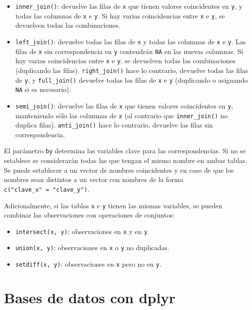 \documentclass[]{book}
\begin{document}
\begin{itemize}
\item
  \texttt{inner\_join()}: devuelve las filas de \texttt{x} que tienen
  valores coincidentes en \texttt{y}, y todas las columnas de \texttt{x}
  e \texttt{y}. Si hay varias coincidencias entre \texttt{x} e
  \texttt{y}, se devuelven todas las combinaciones.
\item
  \texttt{left\_join()}: devuelve todas las filas de \texttt{x} y todas
  las columnas de \texttt{x} e \texttt{y}. Las filas de \texttt{x} sin
  correspondencia en \texttt{y} contendrán \texttt{NA} en las nuevas
  columnas. Si hay varias coincidencias entre \texttt{x} e \texttt{y},
  se devuelven todas las combinaciones (duplicando las filas).
  \texttt{right\_join()} hace lo contrario, devuelve todas las filas de
  \texttt{y}, y \texttt{full\_join()} devuelve todas las filas de
  \texttt{x} e \texttt{y} (duplicando o asignando \texttt{NA} si es
  necesario).
\item
  \texttt{semi\_join()}: devuelve las filas de \texttt{x} que tienen
  valores coincidentes en \texttt{y}, manteniendo sólo las columnas de
  \texttt{x} (al contrario que \texttt{inner\_join()} no duplica filas).
  \texttt{anti\_join()} hace lo contrario, devuelve las filas sin
  correspondencia.
\end{itemize}

El parámetro \texttt{by} determina las variables clave para las
correspondencias. Si no se establece se considerarán todas las que
tengan el mismo nombre en ambas tablas. Se puede establecer a un vector
de nombres coincidentes y en caso de que los nombres sean distintos a un
vector con nombres de la forma \texttt{c("clave\_x"\ =\ "clave\_y")}.

Adicionalmente, si las tablas \texttt{x} e \texttt{y} tienen las mismas
variables, se pueden combinar las observaciones con operaciones de
conjuntos:

\begin{itemize}
\item
  \texttt{intersect(x,\ y)}: observaciones en \texttt{x} y en
  \texttt{y}.
\item
  \texttt{union(x,\ y)}: observaciones en \texttt{x} o \texttt{y} no
  duplicadas.
\item
  \texttt{setdiff(x,\ y)}: observaciones en \texttt{x} pero no en
  \texttt{y}.
\end{itemize}

\section{Bases de datos con dplyr}\label{bases-de-datos-con-dplyr}
\end{document}
